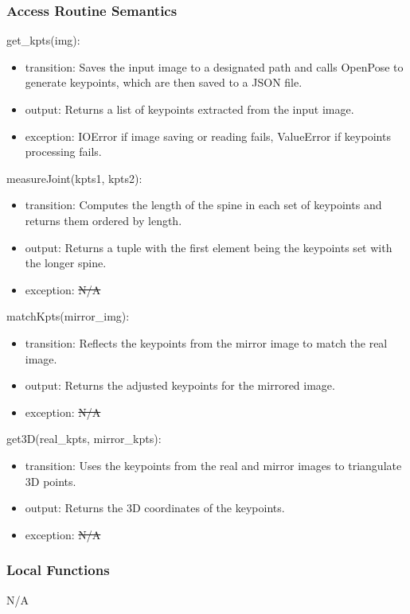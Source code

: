 \documentclass[12pt, titlepage]{article}
\newcommand{\rt}[1]{\textcolor{red}{#1}}
\begin{document}
\subsubsection{Access Routine Semantics}
\noindent get\_kpts(img):
\begin{itemize}
\item transition: Saves the input image to a designated path and calls OpenPose to
  generate keypoints, which are then saved to a JSON file.
\item output: Returns a list of keypoints extracted from the input image.
\item exception: IOError if image saving or reading fails, ValueError if keypoints
  processing fails.
\end{itemize}

\noindent measureJoint(kpts1, kpts2):
\begin{itemize}
\item transition: Computes the length of the spine in each set of keypoints and
  returns them ordered by length.
\item output: Returns a tuple with the first element being the keypoints set with
  the longer spine.
\item exception: \sout{N/A} \rt{}
\end{itemize}

\noindent matchKpts(mirror\_img):
\begin{itemize}
\item transition: Reflects the keypoints from the mirror image to match the real
  image.
\item output: Returns the adjusted keypoints for the mirrored image.
\item exception: \sout{N/A} \rt{}
\end{itemize}

\noindent get3D(real\_kpts, mirror\_kpts):
\begin{itemize}
\item transition: Uses the keypoints from the real and mirror images to triangulate
  3D points.
\item output: Returns the 3D coordinates of the keypoints.
\item exception: \sout{N/A} \rt{}
\end{itemize}

\subsubsection{Local Functions}
N/A
\end{document}
